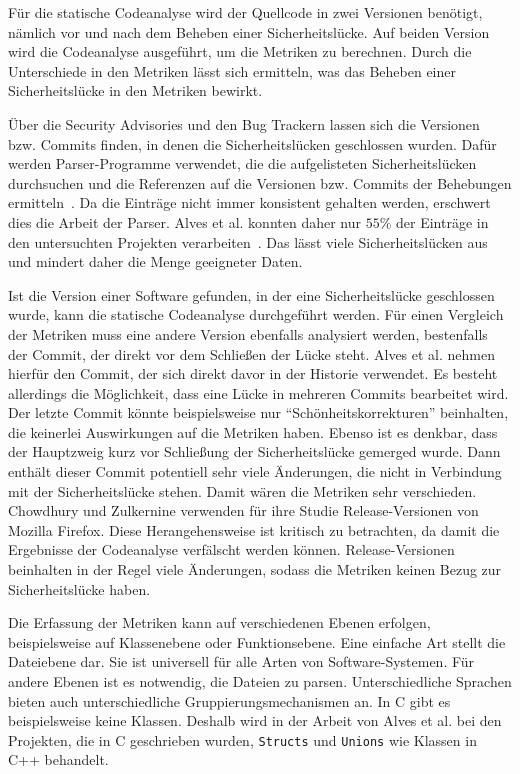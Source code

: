 Für die statische Codeanalyse wird der Quellcode in zwei Versionen benötigt, nämlich vor und nach dem Beheben einer Sicherheitslücke.
Auf beiden Version wird die Codeanalyse ausgeführt, um die Metriken zu berechnen.
Durch die Unterschiede in den Metriken lässt sich ermitteln, was das Beheben einer Sicherheitslücke in den Metriken bewirkt.

Über die Security Advisories und den Bug Trackern lassen sich die Versionen bzw. Commits finden, in denen die Sicherheitslücken geschlossen wurden.
Dafür werden Parser-Programme verwendet, die die aufgelisteten Sicherheitslücken durchsuchen und die Referenzen auf die Versionen bzw. Commits der Behebungen ermitteln~\cite{alves_et_al,chowdhury_zulkernine_2009}.
Da die Einträge nicht immer konsistent gehalten werden, erschwert dies die Arbeit der Parser.
Alves et al. konnten daher nur $55 \%$ der Einträge in den untersuchten Projekten verarbeiten~\cite{alves_et_al}.
Das lässt viele Sicherheitslücken aus und mindert daher die Menge geeigneter Daten.

Ist die Version einer Software gefunden, in der eine Sicherheitslücke geschlossen wurde, kann die statische Codeanalyse durchgeführt werden.
Für einen Vergleich der Metriken muss eine andere Version ebenfalls analysiert werden, bestenfalls der Commit, der direkt vor dem Schließen der Lücke steht.
Alves et al. nehmen hierfür den Commit, der sich direkt davor in der Historie verwendet.
Es besteht allerdings die Möglichkeit, dass eine Lücke in mehreren Commits bearbeitet wird.
Der letzte Commit könnte beispielsweise nur "`Schönheitskorrekturen"' beinhalten, die keinerlei Auswirkungen auf die Metriken haben.
Ebenso ist es denkbar, dass der Hauptzweig kurz vor Schließung der Sicherheitslücke gemerged wurde.
Dann enthält dieser Commit potentiell sehr viele Änderungen, die nicht in Verbindung mit der Sicherheitslücke stehen.
Damit wären die Metriken sehr verschieden.
Chowdhury und Zulkernine verwenden für ihre Studie Release-Versionen von Mozilla Firefox.
Diese Herangehensweise ist kritisch zu betrachten, da damit die Ergebnisse der Codeanalyse verfälscht werden können.
Release-Versionen beinhalten in der Regel viele Änderungen, sodass die Metriken keinen Bezug zur Sicherheitslücke haben.

Die Erfassung der Metriken kann auf verschiedenen Ebenen erfolgen, beispielsweise auf Klassenebene oder Funktionsebene.
Eine einfache Art stellt die Dateiebene dar.
Sie ist universell für alle Arten von Software-Systemen.
Für andere Ebenen ist es notwendig, die Dateien zu parsen.
Unterschiedliche Sprachen bieten auch unterschiedliche Gruppierungsmechanismen an.
In C gibt es beispielsweise keine Klassen.
Deshalb wird in der Arbeit von Alves et al. bei den Projekten, die in C geschrieben wurden, \texttt{Structs} und \texttt{Unions} wie Klassen in C++ behandelt.


